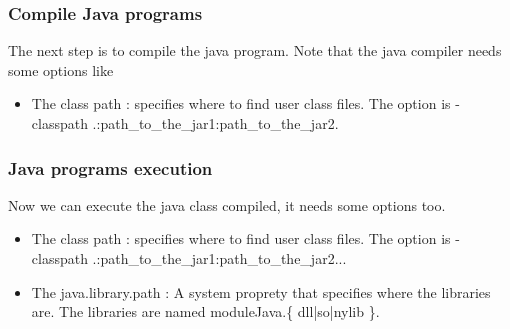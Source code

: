 \subsubsection{Compile Java programs}
The next step is to compile the java program. Note that the java compiler needs some options like 
\begin{itemize}
\item The class path  : specifies where to find user class files. The option is  -classpath .:path\_to\_the\_jar1:path\_to\_the\_jar2.
\end{itemize}

\subsubsection{Java programs execution}
Now we can execute the java class compiled, it needs some options too.
\begin{itemize}
\item The class path  : specifies where to find user class files. The option is -classpath .:path\_to\_the\_jar1:path\_to\_the\_jar2...
\item The java.library.path : A system proprety that specifies where the libraries are. The libraries are named moduleJava.\{ dll|so|nylib \}.
\end{itemize}

